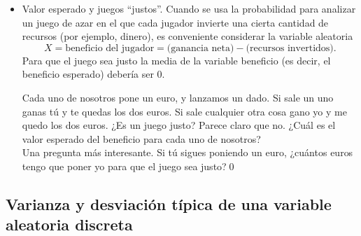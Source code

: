 \begin{itemize}
        \item {\sf Valor esperado y juegos ``justos''.}
        Cuando se usa la probabilidad para analizar un juego de azar en el que cada jugador invierte una cierta cantidad de recursos (por ejemplo, dinero), es conveniente considerar la variable aleatoria
        \[X=\mbox{beneficio del jugador}=\mbox{(ganancia neta)}-\mbox{(recursos invertidos)}.\]
        Para que el juego sea justo la media de la variable beneficio (es decir, el beneficio esperado) debería ser $0$.
        \begin{Ejemplo}
        Cada uno de nosotros pone un euro, y lanzamos un dado. Si sale un uno ganas tú y te quedas los dos euros. Si sale cualquier otra cosa gano yo y me quedo los dos euros. ¿Es un juego justo? Parece claro que no. ¿Cuál es el valor esperado del beneficio para cada uno de nosotros?\\
        Una pregunta más interesante. Si tú sigues poniendo un euro, ¿cuántos euros tengo que poner yo para que el juego sea justo?\qed
        \end{Ejemplo}

\end{itemize}

\subsection{Varianza y desviación típica de una variable aleatoria discreta}

